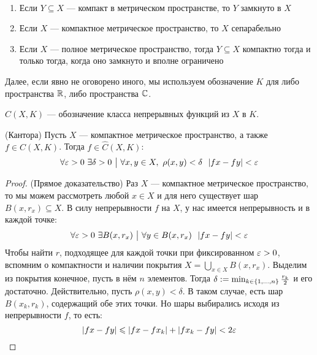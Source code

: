 \begin{exercise}~
	\begin{enumerate}
		\item Если $Y \subseteq X$ --- компакт в метрическом пространстве, то $Y$ замкнуто в $X$
		
		\item Если $X$ --- компактное метрическое пространство, то $X$ сепарабельно
		
		\item Если $X$ --- полное метрическое пространство, тогда $Y \subseteq X$ компактно тогда и только тогда, когда оно замкнуто и вполне ограничено
	\end{enumerate}
\end{exercise}

\begin{note}
	Далее, если явно не оговорено иного, мы используем обозначение $K$ для либо пространства $\mathbb{R}$, либо пространства $\mathbb{C}$.
\end{note}

\begin{note}
	$C(X, K)$ --- обозначение класса непрерывных функций из $X$ в $K$.
\end{note}

\begin{theorem} (Кантора)
	Пусть $X$ --- компактное метрическое пространство, а также $f \in C(X, K)$. Тогда $f \in \hat{C}(X, K)$:
	\[
		\forall \varepsilon > 0\ \exists \delta > 0 \ \big|\  \forall x, y \in X,\ \rho(x, y) < \delta\ \ |fx - fy| < \varepsilon
	\]
\end{theorem}

\begin{proof} (Прямое доказательство)
	Раз $X$ --- компактное метрическое пространство, то мы можем рассмотреть любой $x \in X$ и для него существует шар $B(x, r_x) \subseteq X$. В силу непрерывности $f$ на $X$, у нас имеется непрерывность и в каждой точке:
	\[
		\forall \varepsilon > 0\ \exists B(x, r_x) \ \big|\  \forall y \in B(x, r_x)\ \ |fx - fy| < \varepsilon
	\]
	Чтобы найти $r$, подходящее для каждой точки при фиксированном $\varepsilon > 0$, вспомним о компактности и наличии покрытия $X = \bigcup_{x \in X} B(x, r_x)$. Выделим из покрытия конечное, пусть в нём $n$ элементов. Тогда $\delta := \min_{k \in \{1, \ldots, n\}} \frac{r_k}{2}$ и его достаточно. Действительно, пусть $\rho(x, y) < \delta$. В таком случае, есть шар $B(x_k, r_k)$, содержащий обе этих точки. Но шары выбирались исходя из непрерывности $f$, то есть:
	\[
		|fx - fy| \leqslant |fx - fx_k| + |fx_k - fy| < 2\varepsilon
	\]
\end{proof}

